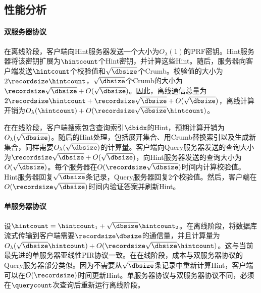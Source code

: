 \subsection{性能分析}
\paragraph{双服务器协议}
在离线阶段，客户端向Hint服务器发送一个大小为$O_\lambda(1)$的PRF密钥。Hint服务器将该密钥扩展为$\hintcount$个Hint密钥，并计算这些Hint。随后，服务器向客户端发送$\hintcount$个校验值和$\sqrt{\dbsize}$个Crumb。校验值的大小为$2\recordsize\hintcount$，$\sqrt{\dbsize}$个Crumb的大小为$\recordsize\sqrt{\dbsize} + O(\sqrt{\dbsize})$。因此，离线通信总量为$2\recordsize\hintcount + \recordsize\sqrt{\dbsize} + O(\sqrt{\dbsize})$，离线计算开销为$O_\lambda(\hintcount) + O(\recordsize\sqrt{\dbsize}\hintcount)$。

在在线阶段，客户端搜索包含查询索引$\dbidx$的Hint，预期计算开销为$O_\lambda(\sqrt{\dbsize})$。随后的Hint处理，包括展开集合、用Crumb替换索引以及生成新集合，同样需要$O_\lambda(\sqrt{\dbsize})$的计算量。客户端向Query服务器发送的查询大小为$\recordsize\sqrt{\dbsize} + O(\sqrt{\dbsize})$，向Hint服务器发送的查询大小为$O(\sqrt{\dbsize})$。每个服务器在$O(\recordsize\sqrt{\dbsize})$时间内计算校验值。Hint服务器回复$\sqrt{\dbsize}$条记录，Query服务器回复2个校验值。然后，客户端在$O(\recordsize\sqrt{\dbsize})$时间内验证答案并刷新Hint。

\paragraph{单服务器协议}
设$\hintcount = \hintcount_1 + \sqrt{\dbsize}\hintcount_2$。在离线阶段，将数据库流式传输到客户端需要$\recordsize\dbsize$的通信量，并且计算量为$O_\lambda(\sqrt{\dbsize}\hintcount) + O(\recordsize\sqrt{\dbsize}\hintcount)$。这与当前最先进的单服务器亚线性PIR协议\cite{Piano}一致。在在线阶段，成本与双服务器协议的Query服务器部分类似。因为不需要从$\sqrt{\dbsize}$条记录中重新计算Hint，客户端可以在$O(\recordsize)$时间更新Hint。单服务器协议与双服务器协议不同，必须在$\querycount$次查询后重新运行离线阶段。